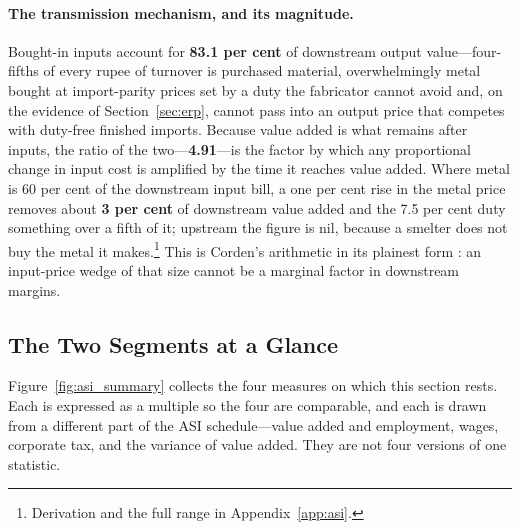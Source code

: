 \paragraph{The transmission mechanism, and its magnitude.} Bought-in inputs account for \textbf{83.1 per cent} of downstream output value---four-fifths of every rupee of turnover is purchased material, overwhelmingly metal bought at import-parity prices set by a duty the fabricator cannot avoid and, on the evidence of Section~\ref{sec:erp}, cannot pass into an output price that competes with duty-free finished imports. Because value added is what remains after inputs, the ratio of the two---\textbf{4.91}---is the factor by which any proportional change in input cost is amplified by the time it reaches value added. Where metal is 60 per cent of the downstream input bill, a one per cent rise in the metal price removes about \textbf{3 per cent} of downstream value added and the 7.5 per cent duty something over a fifth of it; upstream the figure is nil, because a smelter does not buy the metal it makes.\footnote{Derivation and the full range in Appendix~\ref{app:asi}.} This is Corden's arithmetic in its plainest form \cite{corden1966}: an input-price wedge of that size cannot be a marginal factor in downstream margins.

\subsection{The Two Segments at a Glance}

Figure~\ref{fig:asi_summary} collects the four measures on which this section rests. Each is expressed as a multiple so the four are comparable, and each is drawn from a different part of the ASI schedule---value added and employment, wages, corporate tax, and the variance of value added. They are not four versions of one statistic.

